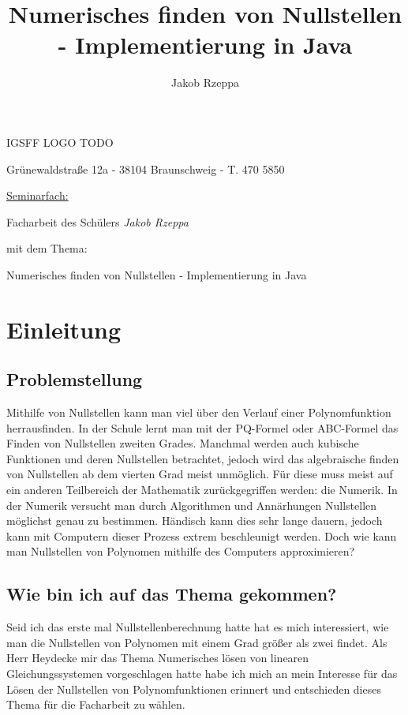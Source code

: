 \documentclass[12pt]{article}
\title{Numerisches finden von Nullstellen - Implementierung in Java}
\author{Jakob Rzeppa}
\begin{document}
\begin{titlepage}
	\centering
    {\huge IGSFF LOGO TODO\par}
	{Grünewaldstraße 12a - 38104 Braunschweig - T. 470 5850\par}
	\vspace{1cm}
	{\underline{Seminarfach:}\par}
	\vspace{1cm}
    {\large Facharbeit des Schülers \textit{Jakob Rzeppa} \par mit dem Thema: \par}
    \vspace{1.5cm}
	{\huge Numerisches finden von Nullstellen - Implementierung in Java\par}
	\vspace{2cm}
\end{titlepage}

\tableofcontents

\section{Einleitung}

\subsection{Problemstellung}
Mithilfe von Nullstellen kann man viel über den Verlauf einer Polynomfunktion herrausfinden. In der Schule lernt man mit der PQ-Formel oder ABC-Formel das Finden von Nullstellen zweiten Grades. Manchmal werden auch kubische Funktionen und deren Nullstellen betrachtet, jedoch wird das algebraische finden von Nullstellen ab dem vierten Grad meist unmöglich. Für diese muss meist auf ein anderen Teilbereich der Mathematik zurückgegriffen werden: die Numerik. In der Numerik versucht man durch Algorithmen und Annärhungen Nullstellen möglichst genau zu bestimmen. Händisch kann dies sehr lange dauern, jedoch kann mit Computern dieser Prozess extrem beschleunigt werden. Doch wie kann man Nullstellen von Polynomen mithilfe des Computers approximieren?

\subsection{Wie bin ich auf das Thema gekommen?} %
Seid ich das erste mal Nullstellenberechnung hatte hat es mich interessiert, wie man die Nullstellen von Polynomen mit einem Grad größer als zwei findet. Als Herr Heydecke mir das Thema Numerisches lösen von linearen Gleichungssystemen vorgeschlagen hatte habe ich mich an mein Interesse für das Lösen der Nullstellen von Polynomfunktionen erinnert und entschieden dieses Thema für die Facharbeit zu wählen.
\end{document}

